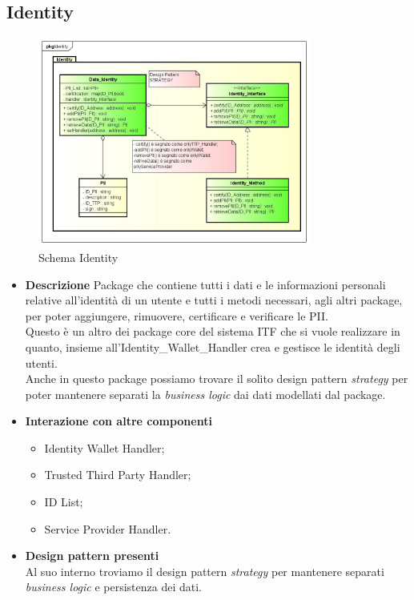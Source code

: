 \subsection{Identity}
\begin{figure}[!h]
	\centering
	\includegraphics[width=0.8\textwidth]{immagini/identity}
	\caption{Schema Identity}
\end{figure}
\begin{itemize}
	\item \textbf{Descrizione}
	Package che contiene tutti i dati e le informazioni personali relative all'identità di un utente e tutti i metodi necessari, agli altri package, per poter aggiungere, rimuovere, certificare e verificare le \gls{PII}.\\
	Questo è un altro dei package core del sistema \gls{ITF} che si vuole realizzare in quanto, insieme all'Identity\_Wallet\_Handler crea e gestisce le identità degli utenti.\\
	Anche in questo package possiamo trovare il solito design pattern \textit{strategy} per poter mantenere separati la \textit{business logic} dai dati modellati dal package.
	\item \textbf{Interazione con altre componenti}
	\begin{itemize}
		\item Identity Wallet Handler;
		\item Trusted Third Party Handler;
		\item ID List;
		\item Service Provider Handler.
	\end{itemize}
	\item \textbf{Design pattern presenti}\\
	Al suo interno troviamo il design pattern \textit{strategy} per mantenere separati \textit{business logic} e persistenza dei dati.
\end{itemize}

